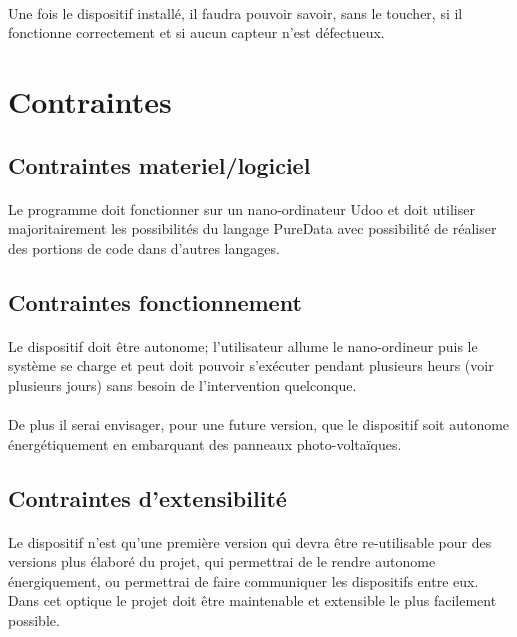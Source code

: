 \documentclass[a4paper, titlepage, oneside, 12pt]{article}%
\begin{document}
\paragraph{}
Une fois le dispositif installé, il faudra pouvoir savoir, sans le toucher, si il fonctionne correctement et si aucun capteur n'est défectueux.


\section{Contraintes}
\subsection{Contraintes materiel/logiciel}
\paragraph{}
Le programme doit fonctionner sur un nano-ordinateur Udoo et doit utiliser majoritairement les possibilités du langage PureData avec possibilité de réaliser des portions de code dans d'autres langages.

\subsection{Contraintes fonctionnement}
\paragraph{}
Le dispositif doit être autonome; l'utilisateur allume le nano-ordineur puis le système se charge et peut doit pouvoir s’exécuter pendant plusieurs heurs (voir plusieurs jours) sans besoin de l’intervention quelconque.

\paragraph{}
De plus il serai envisager, pour une future version, que le dispositif soit autonome énergétiquement en embarquant des panneaux photo-voltaïques.

\subsection{Contraintes d'extensibilité}
\paragraph{}
Le dispositif n'est qu'une première version qui devra être re-utilisable pour des versions plus élaboré du projet, qui permettrai de le rendre autonome énergiquement, ou permettrai de faire communiquer les dispositifs entre eux.\\ Dans cet optique le projet doit être maintenable et extensible le plus facilement possible.
\end{document}
